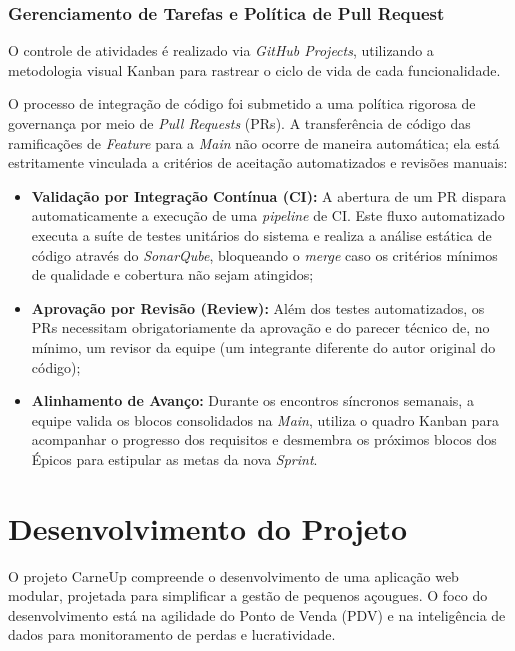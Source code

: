 \documentclass[
	12pt,				%
	openany,			%
	oneside,			%
	a4paper,			%
	english,			%
	french,				%
	spanish,			%
	brazil				%
	]{abntex2}
\begin{document}
\subsection{Gerenciamento de Tarefas e Política de Pull Request}

O controle de atividades é realizado via \textit{GitHub Projects}, utilizando a metodologia visual Kanban para rastrear o ciclo de vida de cada funcionalidade. 

O processo de integração de código foi submetido a uma política rigorosa de governança por meio de \textit{Pull Requests} (PRs). A transferência de código das ramificações de \textit{Feature} para a \textit{Main} não ocorre de maneira automática; ela está estritamente vinculada a critérios de aceitação automatizados e revisões manuais:

\begin{itemize}
    \item \textbf{Validação por Integração Contínua (CI):} A abertura de um PR dispara automaticamente a execução de uma \textit{pipeline} de CI. Este fluxo automatizado executa a suíte de testes unitários do sistema e realiza a análise estática de código através do \textit{SonarQube}, bloqueando o \textit{merge} caso os critérios mínimos de qualidade e cobertura não sejam atingidos;
    \item \textbf{Aprovação por Revisão (Review):} Além dos testes automatizados, os PRs necessitam obrigatoriamente da aprovação e do parecer técnico de, no mínimo, um revisor da equipe (um integrante diferente do autor original do código);
    \item \textbf{Alinhamento de Avanço:} Durante os encontros síncronos semanais, a equipe valida os blocos consolidados na \textit{Main}, utiliza o quadro Kanban para acompanhar o progresso dos requisitos e desmembra os próximos blocos dos Épicos para estipular as metas da nova \textit{Sprint}.
\end{itemize}
\chapter{Desenvolvimento do Projeto}
\label{cap:desenvolvimento}

O projeto CarneUp compreende o desenvolvimento de uma aplicação web modular, projetada para simplificar a gestão de pequenos açougues. O foco do desenvolvimento está na agilidade do Ponto de Venda (PDV) e na inteligência de dados para monitoramento de perdas e lucratividade.
\end{document}
